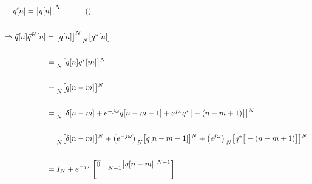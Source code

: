 \documentclass{article}
\begin{document}
\begin{align*}
    & \quad \ \vec{q}[n] = \begin{bmatrix} q[n] \end{bmatrix}^{N} \quad \quad \quad () \\ \\
    & \Rightarrow \vec{q}[n]\vec{q}^{H}[n] = \begin{bmatrix} q[n] \end{bmatrix}^{N}\prescript{}{N}{\begin{bmatrix} q^{*}[n] \end{bmatrix}} \\ \\
    & \quad \quad \quad \quad \quad \ \ = \prescript{}{N}{\begin{bmatrix} q[n]q^{*}[m] \end{bmatrix}}^{N} \\ \\
    & \quad \quad \quad \quad \quad \ \ = \prescript{}{N}{\begin{bmatrix} q[n - m] \end{bmatrix}}^{N} \\ \\
    & \quad \quad \quad \quad \quad \ \ = \prescript{}{N}{\begin{bmatrix} \delta[n - m] + e^{-j\omega}q[n - m - 1] + e^{j\omega}q^{*}\big[-(n - m + 1)\big]\end{bmatrix}}^{N} \\ \\
    & \quad \quad \quad \quad \quad \ \ = \prescript{}{N}{\begin{bmatrix} \delta[n - m] \end{bmatrix}}^{N} + \big(e^{-j\omega}\big)\prescript{}{N}{\begin{bmatrix} q[n - m - 1] \end{bmatrix}}^{N} + \big(e^{j\omega}\big)\prescript{}{N}{\begin{bmatrix} q^{*}\big[-(n - m + 1)\big]\end{bmatrix}}^{N} \\ \\
    & \quad \quad \quad \quad \quad \ \ = I_{N} + e^{-j\omega}\begin{bmatrix}
                                                                    \vec{0} & \prescript{}{N - 1}{\begin{bmatrix} q[n - m] \end{bmatrix}}^{N - 1} \\ \\

\end{bmatrix}
\end{align*}
\end{document}
